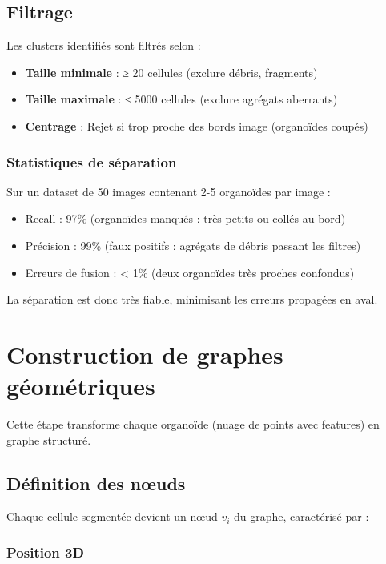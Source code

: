 \subsection{Filtrage}

Les clusters identifiés sont filtrés selon :
\begin{itemize}
    \item \textbf{Taille minimale} : ≥ 20 cellules (exclure débris, fragments)
    \item \textbf{Taille maximale} : ≤ 5000 cellules (exclure agrégats aberrants)
    \item \textbf{Centrage} : Rejet si trop proche des bords image (organoïdes coupés)
\end{itemize}

\subsubsection{Statistiques de séparation}

Sur un dataset de 50 images contenant 2-5 organoïdes par image :
\begin{itemize}
    \item Recall : 97\% (organoïdes manqués : très petits ou collés au bord)
    \item Précision : 99\% (faux positifs : agrégats de débris passant les filtres)
    \item Erreurs de fusion : < 1\% (deux organoïdes très proches confondus)
\end{itemize}

La séparation est donc très fiable, minimisant les erreurs propagées en aval.

\section{Construction de graphes géométriques}

Cette étape transforme chaque organoïde (nuage de points avec features) en graphe structuré.

\subsection{Définition des nœuds}

Chaque cellule segmentée devient un nœud $v_i$ du graphe, caractérisé par :

\subsubsection{Position 3D}

